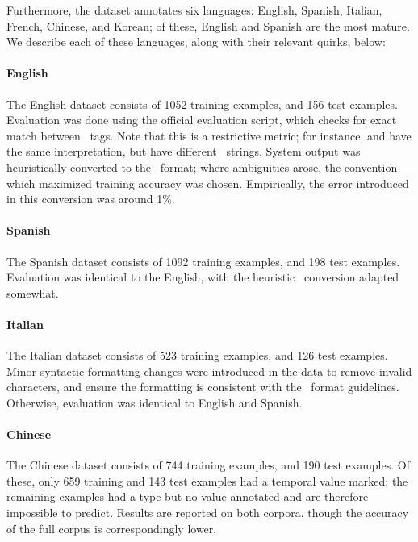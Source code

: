 Furthermore, the dataset annotates six languages:
  English, Spanish, Italian, French, Chinese, and Korean;
  of these, English and Spanish are the most mature.
We describe each of these languages, along with their relevant quirks, below:

\paragraph{English}
The English dataset consists of 1052 training examples, and 156 test examples.
Evaluation was done using the official evaluation script, which checks for
  exact match between \timex\ tags.
Note that this is a restrictive metric; for instance,  and
   have the same interpretation, but
  have different \timex\ strings.
System output was heuristically converted to the \timex\ format; where
  ambiguities arose, the convention which maximized training accuracy was
  chosen.
Empirically, the error introduced in this conversion was around 1\%.

\paragraph{Spanish}
The Spanish dataset consists of 1092 training examples, and 198 test examples.
Evaluation was identical to the English, with the heuristic \timex\ conversion
  adapted somewhat.

\paragraph{Italian}
The Italian dataset consists of 523 training examples, and 126 test examples.
Minor syntactic formatting changes were introduced in the data to remove invalid
  characters, and ensure the formatting is consistent with the
  \tempeval\ format guidelines.
Otherwise, evaluation was identical to English and Spanish.

\paragraph{Chinese}
The Chinese dataset consists of 744 training examples, and 190 test examples.
Of these, only 659 training and 143 test examples had a temporal value marked;
  the remaining examples had a type but no value annotated and are therefore
  impossible to predict.
Results are reported on both corpora, though the accuracy of the full corpus
  is correspondingly lower.

